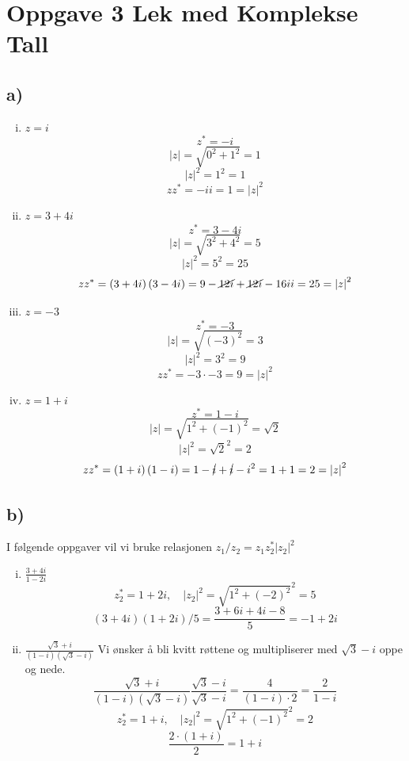 \documentclass{article}
\begin{document}
\section*{Oppgave 3 Lek med Komplekse Tall}
\subsection*{a)}
\begin{enumerate}[(i)]
    \item $z = i$
    \[
    z^{*} = - i 
    \]
    \[
    \left| z \right|  = \sqrt{0^2 + 1^2} = 1 
    \]
    \[
    \left| z \right| ^{2} = 1^{2} = 1
    \] 
    \[
    zz^{*}  = -ii = 1 = \left| z \right| ^{2}
    \]
    \item $z = 3 + 4i$ 
    \[
    z^{*} = 3 - 4i 
    \] 
    \[
    \left| z \right| = \sqrt{3^2 + 4^2} = 5 
    \]
    \[
    \left| z \right| ^{2} = 5^{2} = 25
    \] 
    \[
    zz^{*} = \left( 3 + 4i  \right) \left( 3 - 4i \right) = 9 - \cancel{12i} + \cancel{12i} - 16ii = 25 = \left| z \right| ^{2}
    \]
    \item $z = -3$
    \[
    z^{*} = -3
    \]
    \[
    \left| z \right| = \sqrt{\left( -3 \right) ^{2}} = 3
    \]
    \[
    \left| z \right| ^{2} = 3^{2} = 9
    \]
    \[
    zz^{*} = -3 ⋅ -3 = 9 = \left| z \right| ^{2}
    \]
    \item $z = 1 + i$
    \[
    z^{*} = 1 - i 
    \]
    \[
    \left| z \right| = \sqrt{1^2 + (-1)^2} = \sqrt{2}
    \]
    \[
    \left| z \right| ^{2} = \sqrt{2}^{2} = 2
    \]
    \[
    zz^{*} = \left( 1 + i \right) \left( 1 - i \right) = 1 - \cancel{i} + \cancel{i} - i^{2} = 1 + 1 = 2 = \left| z \right| ^{2}
    \]
\end{enumerate}

\subsection*{b)}
I følgende oppgaver vil vi bruke relasjonen $z_1 / z_2 = z_1 z_2 ^{*} \left| z_2 \right| ^{2}$
\begin{enumerate}[(i)]
    \item $\frac{3 + 4i}{1 - 2i}$
    \[
    z_2^{*} = 1 + 2i, \quad \left| z_2 \right| ^{2} = \sqrt{1^2 + (-2)^2}^{2} = 5
    \]
    \[
    \left( 3 + 4i \right) \left( 1 + 2i  \right) / 5 = \frac{3 + 6i + 4i - 8}{5} = -1 + 2 i
    \]
    \item $\frac{\sqrt{3} + i}{(1 - i)(\sqrt{3}-i)}$
    Vi ønsker å bli kvitt røttene og multipliserer med $\sqrt{3} - i$ oppe og nede. 
    \[
    \frac{\sqrt{3} + i}{(1 - i)(\sqrt{3}-i)} \frac{\sqrt{3}- i}{\sqrt{3}-i} = \frac{4}{(1-i) ⋅ 2} = \frac{2}{1 - i}
    \]
    \[
    z_2^{*} = 1 + i,  \quad \left| z_2 \right| ^{2} = \sqrt{1^2 + (-1)^2}^{2} = 2
    \]
    \[
    \frac{2 ⋅ \left( 1 + i \right)}{2} = 1 + i
    \]
\end{enumerate}
 
\end{document}
